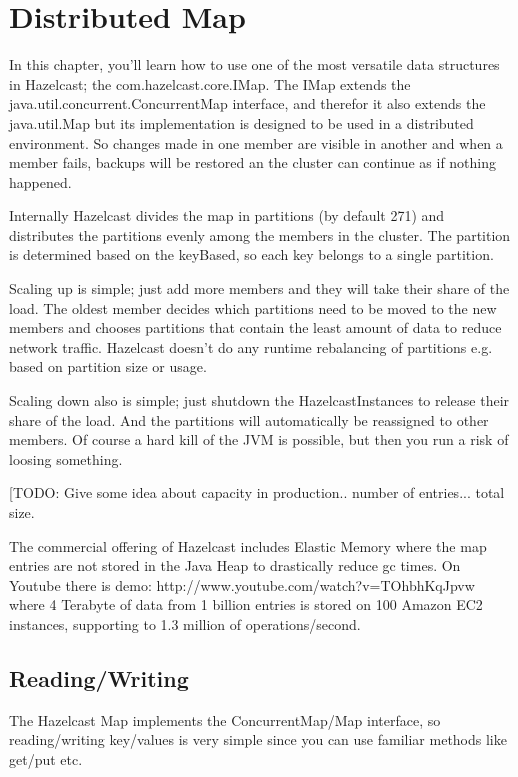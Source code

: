 \chapter{Distributed Map}
In this chapter, you'll learn how to use one of the most versatile data structures in Hazelcast; the com.hazelcast.core.IMap. The IMap extends the java.util.concurrent.ConcurrentMap interface, and therefor it also extends the java.util.Map but its implementation is designed to be used in a distributed environment. So changes made in one member are visible in another and when a member fails, backups will be restored an the cluster can continue as if nothing happened.

Internally Hazelcast divides the map in partitions (by default 271) and distributes the partitions evenly among the members in the cluster. The partition is determined based on the keyBased, so each key belongs to a single partition. 

Scaling up is simple; just add more members and they will take their share of the load. The oldest member decides which partitions need to be moved to the new members and chooses partitions that contain the least amount of data to reduce network traffic. Hazelcast doesn't do any runtime rebalancing of partitions e.g. based on partition size or usage. 

Scaling down also is simple; just shutdown the HazelcastInstances to release their share of the load. And the partitions will automatically be reassigned to other members. Of course a hard kill of the JVM is possible, but then you run a risk of loosing something.

[TODO: Give some idea about capacity in production.. number of entries... total size.

The commercial offering of Hazelcast includes Elastic Memory where the map entries are not stored in the Java Heap to drastically reduce gc times. On Youtube there is demo: http://www.youtube.com/watch?v=TOhbhKqJpvw where 4 Terabyte of data from 1 billion entries is stored on 100 Amazon EC2 instances, supporting to 1.3 million of operations/second.

\section{Reading/Writing}
The Hazelcast Map implements the ConcurrentMap/Map interface, so reading/writing key/values is very simple since you can use familiar methods like get/put etc. 


